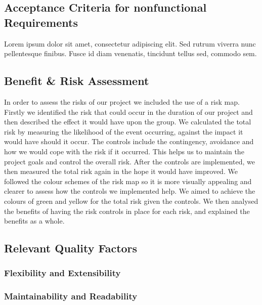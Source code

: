 \documentclass[a4paper, 12pt, titlepage]{article}
\begin{document}
\subsection*{Acceptance Criteria for nonfunctional Requirements}
Lorem ipsum dolor sit amet, consectetur adipiscing elit. Sed rutrum viverra nunc pellentesque finibus. Fusce id diam venenatis, tincidunt tellus sed, commodo sem.

\subsection*{Benefit \& Risk Assessment}

In order to assess the risks of our project we included the use of a risk map. Firstly we identified the risk that could occur in the duration of our project and then described the effect it would have upon the group. We calculated the total risk by measuring the likelihood of the event occurring, against the impact it would have should it occur. The controls include the contingency, avoidance and how we would cope with the risk if it occurred. This helps us to maintain the project goals and control the overall risk. After the controls are implemented, we then measured the total risk again in the hope it would have improved. We followed the colour schemes of the risk map so it is more visually appealing and clearer to assess how the controls we implemented help. We aimed to achieve the colours of green and yellow for the total risk given the controls. We then analysed the benefits of having the risk controls in place for each risk, and explained the benefits as a whole.

\subsection*{Relevant Quality Factors}

\subsubsection*{Flexibility and Extensibility} 

\subsubsection*{Maintainability and Readability} 
\end{document}
